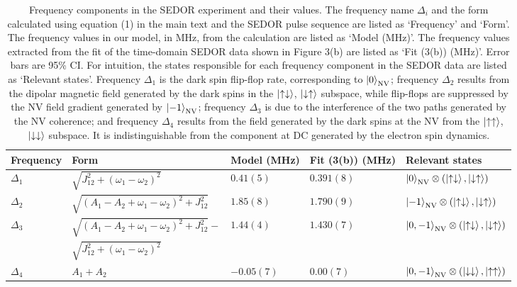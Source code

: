 \documentclass[%
 reprint,
 amsmath,amssymb,
 aps,
]{revtex4-1}
\begin{document}
\begin{table*}[!t]
\caption{Frequency components in the SEDOR experiment and their values. The frequency name $\Delta_{i}$ and the form calculated using equation (1) in the main text and the SEDOR pulse sequence are listed as `Frequency' and `Form'. The frequency values in our model, in MHz, from the calculation are listed as `Model (MHz)'. The frequency values extracted from the fit of the time-domain SEDOR data shown in Figure 3(b) are listed as `Fit (3(b)) (MHz)'. Error bars are 95\% CI. For intuition, the states responsible for each frequency component in the SEDOR data are listed as `Relevant states'. Frequency $\Delta_1$ is the dark spin flip-flop rate, corresponding to $\ket{0}_{\text{NV}}$; frequency $\Delta_2$ results from the dipolar magnetic field generated by the dark spins in the $\ket{\uparrow \downarrow}$, $\ket{\downarrow\uparrow}$ subspace, while flip-flops are suppressed by the NV field gradient generated by $\ket{-1}_{\text{NV}}$; frequency $\Delta_3$ is due to the interference of the two paths generated by the NV coherence; and frequency $\Delta_4$ results from the field generated by the dark spins at the NV from the $\ket{\uparrow\uparrow}$, $\ket{\downarrow\downarrow}$ subspace. It is indistinguishable from the component at DC generated by the electron spin dynamics.}
\centering
\begin{tabular}{ |l|l|p{1.2cm}|p{1.5cm}|l|} 
\hline
 Frequency&Form & Model (MHz)&Fit (3(b)) (MHz)
&Relevant states\\ \hline

$\Delta_{1}$&$\sqrt{J_{12}^2 + (\omega_1-\omega_2)^2}$&$0.41(5)$&$0.391(8)$&$\ket{0}_{\text{NV}}\otimes(\ket{\uparrow\downarrow}, \ket{\downarrow\uparrow})$\\

$\Delta_{2}$&$\sqrt{(A_1 - A_2 + \omega_1 - \omega_2)^2 +J_{12}^2}$&$1.85(8)$&$1.790(9)$&$\ket{-1}_{\text{NV}}\otimes(\ket{\uparrow\downarrow}, \ket{\downarrow\uparrow})$\\

$\Delta_{3}$&$\sqrt{(A_1 - A_2 + \omega_1 - \omega_2)^2 +J_{12}^2}-$&$1.44(4)$&$1.430(7)$&$\ket{0, -1}_{\text{NV}} \otimes(\ket{\uparrow\downarrow}, \ket{\downarrow\uparrow})$\\ 

 &$\sqrt{J_{12}^2 + (\omega_1-\omega_2)^2}$& & & \\

$\Delta_{4}$&$A_1 + A_2$&$-0.05(7)$&$0.00(7)$&$\ket{0,-1}_{\text{NV}}\otimes(\ket{\downarrow\downarrow}, \ket{\uparrow\uparrow})$\\ \hline
\end{tabular}
\label{table:S1}
\end{table*}
\end{document}
